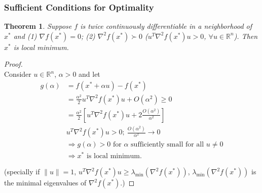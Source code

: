 \documentclass[11pt,a4paper]{article}
\newtheorem{theorem}{Theorem}
\begin{document}
\subsubsection{Sufficient Conditions for Optimality}
\begin{theorem}
Suppose $f$ is twice continuously differentiable in a neighborhood of $x^*$ and
(1) $\nabla f(x^*)=0$; (2) $\nabla^2 f(x^*)\succ 0$ ($u^T\nabla^2 f(x^*) u>0$, $\forall u\in \mathbb{R}^n$).
Then $x^*$ is local minimum.
\end{theorem}
\begin{proof}
\quad\\
Consider $u\in \mathbb{R}^n$, $\alpha>0$ and let
\begin{equation}
    \begin{aligned}
        g(\alpha)&=f(x^*+\alpha u)-f(x^*)\\
        &=\frac{\alpha^2}{2}u^T\nabla^2 f(x^*) u+O(\alpha^2)\geq 0\\
        &=\frac{\alpha^2}{2}[u^T\nabla^2 f(x^*) u+2\frac{O(\alpha^2)}{\alpha^2}]\\
        &u^T\nabla^2 f(x^*) u>0;\ \frac{O(\alpha^2)}{\alpha^2}\rightarrow 0\\
        &\Rightarrow g(\alpha)>0\text{ for }\alpha\text{ sufficiently small for all }u\neq 0\\
        &\Rightarrow x^*\text{ is local minimum}.
    \end{aligned}
    \nonumber
\end{equation}

(specially if $\|u\|=1$, $u^T\nabla^2 f(x^*) u\geq \lambda_{\min}(\nabla^2 f(x^*))$, $\lambda_{\min}(\nabla^2 f(x^*))$ is the minimal eigenvalues of $\nabla^2 f(x^*)$.)
\end{proof}
\end{document}
